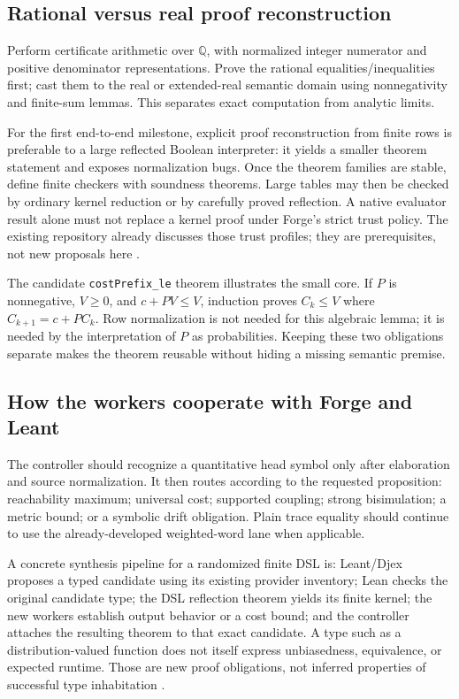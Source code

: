 \documentclass[11pt,letterpaper]{article}
\theoremstyle{definition}\newtheorem{definition}[theorem]{Definition}
\theoremstyle{remark}\newtheorem{remark}[theorem]{Remark}
\newcommand{\Q}{\mathbb Q}\newcommand{\R}{\mathbb R}\newcommand{\N}{\mathbb N}
\newcommand{\code}[1]{\texttt{#1}}
\begin{document}
\subsection{Rational versus real proof reconstruction}
Perform certificate arithmetic over $\Q$, with normalized integer numerator and positive denominator representations. Prove the rational equalities/inequalities first; cast them to the real or extended-real semantic domain using nonnegativity and finite-sum lemmas. This separates exact computation from analytic limits.

For the first end-to-end milestone, explicit proof reconstruction from finite rows is preferable to a large reflected Boolean interpreter: it yields a smaller theorem statement and exposes normalization bugs. Once the theorem families are stable, define finite checkers with soundness theorems. Large tables may then be checked by ordinary kernel reduction or by carefully proved reflection. A native evaluator result alone must not replace a kernel proof under Forge's strict trust policy. The existing repository already discusses those trust profiles; they are prerequisites, not new proposals here \cite{forge-neighbors}.

The candidate \code{costPrefix\_le} theorem illustrates the small core. If $P$ is nonnegative, $V\ge0$, and $c+PV\le V$, induction proves $C_k\le V$ where $C_{k+1}=c+PC_k$. Row normalization is not needed for this algebraic lemma; it is needed by the interpretation of $P$ as probabilities. Keeping these two obligations separate makes the theorem reusable without hiding a missing semantic premise.

\subsection{How the workers cooperate with Forge and Leant}
The controller should recognize a quantitative head symbol only after elaboration and source normalization. It then routes according to the requested proposition: reachability maximum; universal cost; supported coupling; strong bisimulation; a metric bound; or a symbolic drift obligation. Plain trace equality should continue to use the already-developed weighted-word lane when applicable.

A concrete synthesis pipeline for a randomized finite DSL is: Leant/Djex proposes a typed candidate using its existing provider inventory; Lean checks the original candidate type; the DSL reflection theorem yields its finite kernel; the new workers establish output behavior or a cost bound; and the controller attaches the resulting theorem to that exact candidate. A type such as a distribution-valued function does not itself express unbiasedness, equivalence, or expected runtime. Those are new proof obligations, not inferred properties of successful type inhabitation \cite{leant,djex}.
\end{document}
